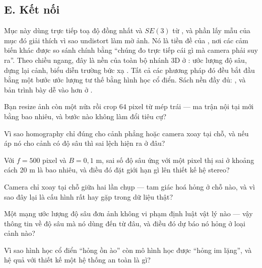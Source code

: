 \documentclass[../../../deep_learning.tex]{subfiles}
\begin{document}
\subsection{E. Kết nối}
Mục này dùng trực tiếp toạ độ đồng nhất và \(SE(3)\) từ , và phần lấy mẫu của mục đó giải thích vì sao undistort làm mờ ảnh. Nó là tiền đề của , nơi các cảm biến khác được so sánh chính bằng ``chúng đo trực tiếp cái gì mà camera phải suy ra''. Theo chiều ngang, đây là nền của toàn bộ nhánh 3D ở : ước lượng độ sâu, dựng lại cảnh, biểu diễn trường bức xạ \cite{mildenhall2020nerf}. Tất cả các phương pháp đó đều bắt đầu bằng một bước ước lượng tư thế bằng hình học cổ điển. Sách nền đầy đủ: \cite{hartley2004}, và bản trình bày dễ vào hơn ở \cite{szeliski2022}.

\begin{tukiem}
\item Bạn resize ảnh còn một nửa rồi crop \(64\) pixel từ mép trái --- ma trận nội tại mới bằng bao nhiêu, và bước nào không làm đổi tiêu cự?
\item Vì sao homography chỉ đúng cho cảnh phẳng hoặc camera xoay tại chỗ, và nếu áp nó cho cảnh có độ sâu thì sai lệch hiện ra ở đâu?
\item Với \(f=500\) pixel và \(B=0{,}1\) m, sai số độ sâu ứng với một pixel thị sai ở khoảng cách 20 m là bao nhiêu, và điều đó đặt giới hạn gì lên thiết kế hệ stereo?
\item Camera chỉ xoay tại chỗ giữa hai lần chụp --- tam giác hoá hỏng ở chỗ nào, và vì sao đây lại là cấu hình rất hay gặp trong dữ liệu thật?
\item Một mạng ước lượng độ sâu đơn ảnh không vi phạm định luật vật lý nào --- vậy thông tin về độ sâu mà nó dùng đến từ đâu, và điều đó dự báo nó hỏng ở loại cảnh nào?
\item Vì sao hình học cổ điển ``hỏng ồn ào'' còn mô hình học được ``hỏng im lặng'', và hệ quả với thiết kế một hệ thống an toàn là gì?
\end{tukiem}
\ifSubfilesClassLoaded{\printbibliography[title={Nguồn}]}{}
\end{document}
